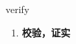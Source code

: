 
\begin{frame}
{\huge verify}
\begin{center}
\begin{enumerate}\Large
  \item \textbf{校验，证实}
\end{enumerate}
\end{center}
\end{frame}
